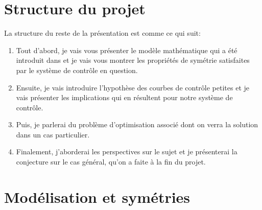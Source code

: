 \documentclass[12pt,a4paper]{article}
\theoremstyle{plain}
\theoremstyle{plain}
\theoremstyle{plain}
\theoremstyle{definition}
\theoremstyle{definition}
\theoremstyle{definition}
\theoremstyle{plain}
\begin{document}
\section{Structure du projet}
La structure du reste de la présentation est comme ce qui suit:
\begin{enumerate}
\item Tout d'abord, je vais vous présenter le modèle mathématique qui a été introduit dans \cite{Alouges2013} et je vais vous montrer les propriétés de symétrie satisfaites par le système de contrôle en question.

\item Ensuite, je vais introduire l'hypothèse des courbes de contrôle petites et je vais présenter les implications qui en résultent pour notre système de contrôle. 

\item Puis, je parlerai du problème d'optimisation associé dont on verra la solution dans un cas particulier.

\item Finalement, j'aborderai les perspectives sur le sujet et je présenterai la conjecture sur le cas général, qu'on a faite à la fin du projet.
\end{enumerate}


\section{Modélisation et symétries}
\end{document}
